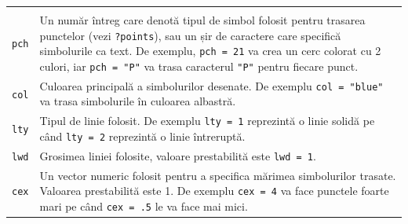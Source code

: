 \documentclass[]{article}
\begin{document}
\begin{longtable}[]{@{}ll@{}}
\begin{minipage}[t]{0.75\columnwidth}
\end{minipage}\tabularnewline
\begin{minipage}[t]{0.19\columnwidth}\raggedright
\texttt{pch}\strut
\end{minipage} & \begin{minipage}[t]{0.75\columnwidth}\raggedright
Un număr întreg care denotă tipul de simbol folosit pentru trasarea
punctelor (vezi \texttt{?points}), sau un șir de caractere care
specifică simbolurile ca text. De exemplu, \texttt{pch\ =\ 21} va crea
un cerc colorat cu 2 culori, iar \texttt{pch\ =\ "P"} va trasa
caracterul \texttt{"P"} pentru fiecare punct.\strut
\end{minipage}\tabularnewline
\begin{minipage}[t]{0.19\columnwidth}\raggedright
\texttt{col}\strut
\end{minipage} & \begin{minipage}[t]{0.75\columnwidth}\raggedright
Culoarea principală a simbolurilor desenate. De exemplu
\texttt{col\ =\ "blue"} va trasa simbolurile în culoarea albastră.\strut
\end{minipage}\tabularnewline
\begin{minipage}[t]{0.19\columnwidth}\raggedright
\texttt{lty}\strut
\end{minipage} & \begin{minipage}[t]{0.75\columnwidth}\raggedright
Tipul de linie folosit. De exemplu \texttt{lty\ =\ 1} reprezintă o linie
solidă pe când \texttt{lty\ =\ 2} reprezintă o linie întreruptă.\strut
\end{minipage}\tabularnewline
\begin{minipage}[t]{0.19\columnwidth}\raggedright
\texttt{lwd}\strut
\end{minipage} & \begin{minipage}[t]{0.75\columnwidth}\raggedright
Grosimea liniei folosite, valoare prestabilită este
\texttt{lwd\ =\ 1}.\strut
\end{minipage}\tabularnewline
\begin{minipage}[t]{0.19\columnwidth}\raggedright
\texttt{cex}\strut
\end{minipage} & \begin{minipage}[t]{0.75\columnwidth}\raggedright
Un vector numeric folosit pentru a specifica mărimea simbolurilor
trasate. Valoarea prestabilită este 1. De exemplu \texttt{cex\ =\ 4} va
face punctele foarte mari pe când \texttt{cex\ =\ .5} le va face mai
mici.\strut
\end{minipage}\tabularnewline
\bottomrule
\end{longtable}
\end{document}

